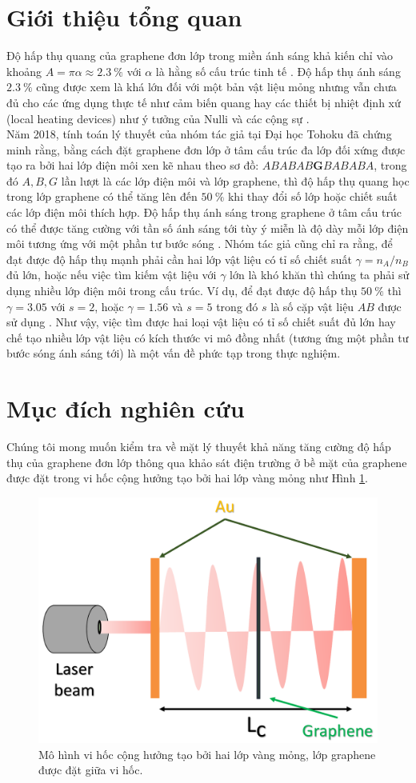 \documentclass[13pt, a4paper]{elsarticle}
\begin{document}
\onehalfspacing
\section{Giới thiệu tổng quan} 
Độ hấp thụ quang của graphene đơn lớp trong miền ánh sáng khả kiến chỉ vào khoảng $A=\pi \alpha\approx \SI{2.3}{\percent}$ với $\alpha$ là hằng số cấu trúc tinh tế \cite{R.R.NairFSC}. Độ hấp thụ ánh sáng $\SI{2.3}{\percent}$ cũng được xem là khá lớn đối với một bản vật liệu mỏng nhưng vẫn chưa đủ cho các ứng dụng thực tế như cảm biến quang hay các thiết bị nhiệt định xứ (local heating devices) như ý tưởng của Nulli và các cộng sự \cite{NulliAPL18}.\\
Năm 2018, tính toán lý thuyết của nhóm tác giả tại Đại học Tohoku đã chứng minh rằng, bằng cách đặt graphene đơn lớp ở tâm cấu trúc đa lớp đối xứng được tạo ra bởi hai lớp điện môi xen kẽ nhau theo sơ đồ: $ABABAB\textbf{G}BABABA$, trong đó $A, B, G$ lần lượt là các lớp điện môi và lớp graphene, thì độ hấp thụ quang học trong lớp graphene có thể tăng lên đến $\SI{50}{\percent}$  khi thay đổi số lớp hoặc chiết suất các lớp điện môi thích hợp. Độ hấp thụ ánh sáng trong graphene ở tâm cấu trúc có thể được tăng cường với tần số ánh sáng tới tùy ý miễn là độ dày mỗi lớp điện môi tương ứng với một phần tư bước sóng \cite{NulliAPL18}. Nhóm tác giả cũng chỉ ra rằng, để đạt được độ hấp thụ mạnh phải cần hai lớp vật liệu có tỉ số chiết suất $\gamma=n_A/n_B$ đủ lớn, hoặc nếu việc tìm kiếm vật liệu với $\gamma$ lớn là khó khăn thì chúng ta phải sử dụng nhiều lớp điện môi trong cấu trúc. Ví dụ, để đạt được độ hấp thụ $\SI{50}{\percent}$ thì $\gamma=3.05$ với $s=2$, hoặc $\gamma=1.56$ và $s=5$ trong đó $s$ là số cặp vật liệu $AB$ được sử dụng \cite{NulliAPL18}. Như vậy, việc tìm được hai loại vật liệu có tỉ số chiết suất đủ lớn hay chế tạo nhiều lớp vật liệu có kích thước vi mô đồng nhất (tương ứng một phần tư bước sóng ánh sáng tới) là một vấn đề phức tạp trong thực nghiệm.
\section{Mục đích nghiên cứu}
Chúng tôi mong muốn kiểm tra về mặt lý thuyết khả năng tăng cường độ hấp thụ của graphene đơn lớp thông qua khảo sát điện trường ở bề mặt của graphene được đặt trong vi hốc cộng hưởng tạo bởi hai lớp vàng mỏng như Hình \ref{fig:1}. 
\begin{figure}[h]
	\centering
	\includegraphics[width=0.6\linewidth]{figs/fig1model.pdf}
	\caption{Mô hình vi hốc cộng hưởng tạo bởi hai lớp vàng mỏng, lớp graphene được đặt giữa vi hốc.}
	\label{fig:1}
\end{figure}
\end{document}

